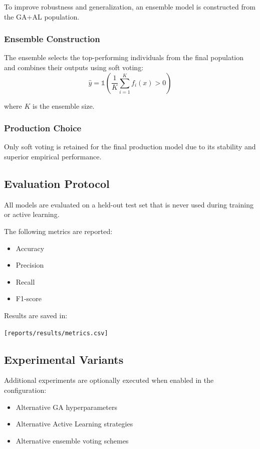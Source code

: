\documentclass[12pt,a4paper]{article}
\begin{document}
To improve robustness and generalization, an ensemble model is constructed from the GA+AL population.

\subsubsection{Ensemble Construction}

The ensemble selects the top-performing individuals from the final population and combines their outputs using soft voting:
\[
\hat{y} = \mathbb{1}\left( \frac{1}{K} \sum_{i=1}^{K} f_i(x) > 0 \right)
\]

where $K$ is the ensemble size.

\subsubsection{Production Choice}

Only soft voting is retained for the final production model due to its stability and superior empirical performance.

\subsection{Evaluation Protocol}

All models are evaluated on a held-out test set that is never used during training or active learning.

The following metrics are reported:
\begin{itemize}
    \item Accuracy
    \item Precision
    \item Recall
    \item F1-score
\end{itemize}

Results are saved in:
\begin{center}
\texttt{[reports/results/metrics.csv]}
\end{center}

\subsection{Experimental Variants}

Additional experiments are optionally executed when enabled in the configuration:
\begin{itemize}
    \item Alternative GA hyperparameters
    \item Alternative Active Learning strategies
    \item Alternative ensemble voting schemes
\end{itemize}
\end{document}
